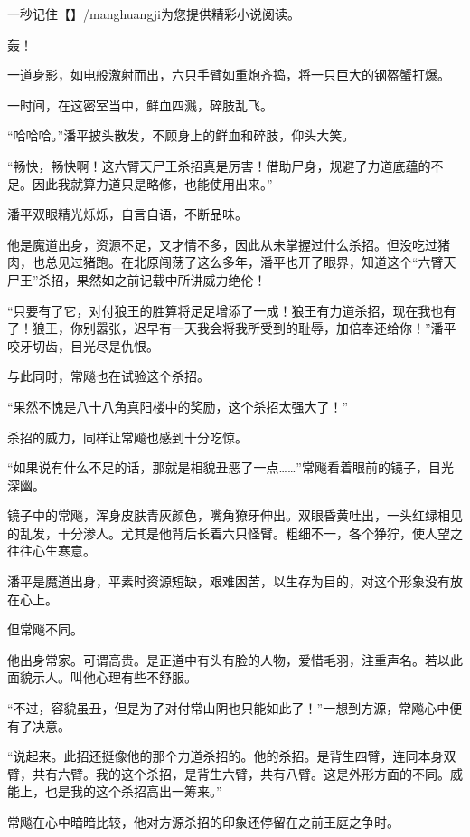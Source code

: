 
\begin{this_body}

一秒记住【】/manghuangji为您提供精彩小说阅读。

轰！

一道身影，如电般激射而出，六只手臂如重炮齐捣，将一只巨大的钢盔蟹打爆。

一时间，在这密室当中，鲜血四溅，碎肢乱飞。

“哈哈哈。”潘平披头散发，不顾身上的鲜血和碎肢，仰头大笑。

“畅快，畅快啊！这六臂天尸王杀招真是厉害！借助尸身，规避了力道底蕴的不足。因此我就算力道只是略修，也能使用出来。”

潘平双眼精光烁烁，自言自语，不断品味。

他是魔道出身，资源不足，又才情不多，因此从未掌握过什么杀招。但没吃过猪肉，也总见过猪跑。在北原闯荡了这么多年，潘平也开了眼界，知道这个“六臂天尸王”杀招，果然如之前记载中所讲威力绝伦！

“只要有了它，对付狼王的胜算将足足增添了一成！狼王有力道杀招，现在我也有了！狼王，你别嚣张，迟早有一天我会将我所受到的耻辱，加倍奉还给你！”潘平咬牙切齿，目光尽是仇恨。

与此同时，常飚也在试验这个杀招。

“果然不愧是八十八角真阳楼中的奖励，这个杀招太强大了！”

杀招的威力，同样让常飚也感到十分吃惊。

“如果说有什么不足的话，那就是相貌丑恶了一点……”常飚看着眼前的镜子，目光深幽。

镜子中的常飚，浑身皮肤青灰颜色，嘴角獠牙伸出。双眼昏黄吐出，一头红绿相见的乱发，十分渗人。尤其是他背后长着六只怪臂。粗细不一，各个狰狞，使人望之往往心生寒意。

潘平是魔道出身，平素时资源短缺，艰难困苦，以生存为目的，对这个形象没有放在心上。

但常飚不同。

他出身常家。可谓高贵。是正道中有头有脸的人物，爱惜毛羽，注重声名。若以此面貌示人。叫他心理有些不舒服。

“不过，容貌虽丑，但是为了对付常山阴也只能如此了！”一想到方源，常飚心中便有了决意。

“说起来。此招还挺像他的那个力道杀招的。他的杀招。是背生四臂，连同本身双臂，共有六臂。我的这个杀招，是背生六臂，共有八臂。这是外形方面的不同。威能上，也是我的这个杀招高出一筹来。”

常飚在心中暗暗比较，他对方源杀招的印象还停留在之前王庭之争时。


\end{this_body}
